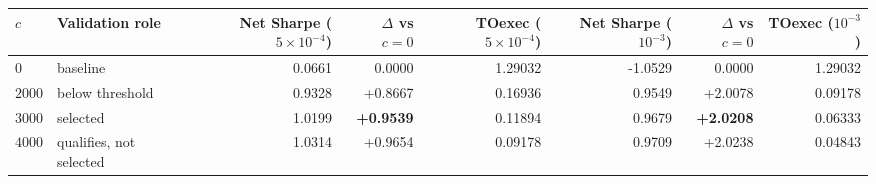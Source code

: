 \begin{tabular}{l l r r r r r r}
\hline
$c$ & Validation role & Net Sharpe ($5\times10^{-4}$) & $\Delta$ vs $c=0$ & TOexec ($5\times10^{-4}$) & Net Sharpe ($10^{-3}$) & $\Delta$ vs $c=0$ & TOexec ($10^{-3}$) \\
\hline
$0$ & baseline & 0.0661 & 0.0000 & 1.29032 & -1.0529 & 0.0000 & 1.29032 \\
$2000$ & below threshold & 0.9328 & +0.8667 & 0.16936 & 0.9549 & +2.0078 & 0.09178 \\
$3000$ & selected & 1.0199 & \textbf{+0.9539} & 0.11894 & 0.9679 & \textbf{+2.0208} & 0.06333 \\
$4000$ & qualifies, not selected & 1.0314 & +0.9654 & 0.09178 & 0.9709 & +2.0238 & 0.04843 \\
\hline
\end{tabular}
